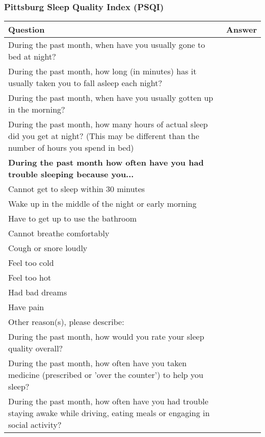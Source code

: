 \subsubsection{Pittsburg Sleep Quality Index (PSQI)}
\begin{table}[H]
    \centering
    \renewcommand{\arraystretch}{1.2}
    \begin{tabularx}{\textwidth}{|X|l|}
        \hline
        \textbf{Question} & \textbf{Answer} \\ \hline
        During the past month, when have you usually gone to bed at night? &  \\ \hline
        During the past month, how long (in minutes) has it usually taken you to fall asleep each night? &  \\ \hline
        During the past month, when have you usually gotten up in the morning? &  \\ \hline
        During the past month, how many hours of actual sleep did you get at night? (This may be different than the number of hours you spend in bed) &  \\ \hline
        \textbf{During the past month how often have you had trouble sleeping because you...} & \\ \hline
        \quad Cannot get to sleep within 30 minutes &  \\ \hline
        \quad Wake up in the middle of the night or early morning &  \\ \hline
        \quad Have to get up to use the bathroom &  \\ \hline
        \quad Cannot breathe comfortably &  \\ \hline
        \quad Cough or snore loudly &  \\ \hline
        \quad Feel too cold &  \\ \hline
        \quad Feel too hot &  \\ \hline
        \quad Had bad dreams &  \\ \hline
        \quad Have pain &  \\ \hline
        \quad Other reason(s), please describe: &  \\ \hline
        During the past month, how would you rate your sleep quality overall? &  \\ \hline
        During the past month, how often have you taken medicine (prescribed or 'over the counter') to help you sleep? &  \\ \hline
        During the past month, how often have you had trouble staying awake while driving, eating meals or engaging in social activity? &  \\ \hline

\end{tabularx}
\end{table}
